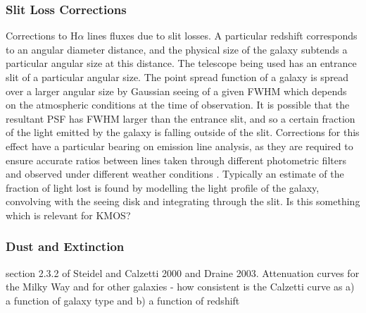 \documentclass{literature}
\begin{document}
\subsubsection{Slit Loss Corrections}
Corrections to H$\alpha$ lines fluxes due to slit losses. A particular redshift corresponds to an angular diameter distance, and the physical size of the galaxy subtends a particular angular size at this distance. The telescope being used has an entrance slit of a particular angular size. The point spread function of a galaxy is spread over a larger angular size by Gaussian seeing of a given FWHM which depends on the atmospheric conditions at the time of observation. It is possible that the resultant PSF has FWHM larger than the entrance slit, and so a certain fraction of the light emitted by the galaxy is falling outside of the slit. Corrections for this effect have a particular bearing on emission line analysis, as they are required to ensure accurate ratios between lines taken through different photometric filters and observed under different weather conditions \citep{Reddy2015}. Typically an estimate of the fraction of light lost is found by modelling the light profile of the galaxy, convolving with the seeing disk and integrating through the slit. Is this something which is relevant for KMOS?     


\subsubsection{Dust and Extinction}
section 2.3.2 of Steidel and Calzetti 2000 and Draine 2003. Attenuation curves for the Milky Way and for other galaxies - how consistent is the Calzetti curve as a) a function of galaxy type and b) a function of redshift 
\end{document}
